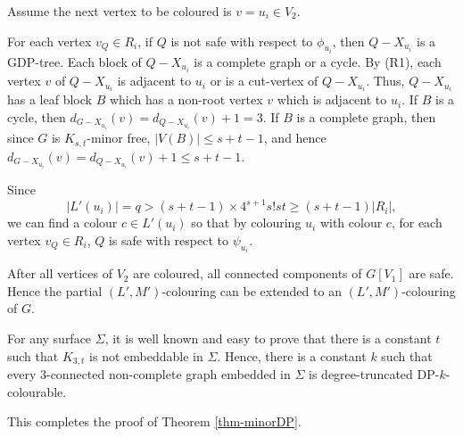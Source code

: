 \documentclass[11pt,a4paper]{article}
\theoremstyle{definition}
\begin{document}
Assume the next vertex to be coloured is $v=u_i \in V_2$. 

For each vertex $v_Q \in R_i$, if $Q$ is not safe with respect to $\phi_{u_i}$, then $Q-X_{u_i}$ is a GDP-tree. 
 Each block of $Q-X_{u_i}$ is a complete graph or a cycle. By (R1),  each vertex $v$ of $Q-X_{u_i}$ is adjacent to $u_i$ or is a cut-vertex of $Q-X_{u_i}$. Thus, $Q-X_{u_i}$ has a leaf block $B$ which has a non-root vertex $v$ which is adjacent to $u_i$. 
  If $B$ is a cycle, then $d_{G-X_{u_i}}(v) = d_{Q-X_{u_i}}(v)+1 = 3$. If $B$ is a complete graph, then 
  since $G$ is $K_{s,t}$-minor free, $|V(B)| \le s+t-1$, and hence  $d_{G-X_{u_i}}(v) = d_{Q-X_{u_i}}(v)+1 \le s+t-1$. 

  Since $$|L'(u_i)|=q>(s+t-1)\times 4^{s+1}s!st\ge (s+t-1)|R_i|,$$
  we can find a colour   $c \in L'(u_i)$
  so that by colouring $u_i$ with colour $c$, for each vertex $v_Q \in R_i$, $Q$ is safe with respect to $\psi_{u_i}$.
 
After all vertices of $V_2$ are coloured, all connected components of $G[V_1]$ are safe. Hence the partial $(L',M')$-colouring can be extended to an $(L',M')$-colouring of $G$. 
 
  

  For any surface $\Sigma$, it is well known and easy to prove that there is a constant $t$ such that $K_{3,t}$ is not embeddable in $\Sigma$. Hence, there is a constant $k$ such that every 3-connected non-complete graph embedded in $\Sigma$ is degree-truncated DP-$k$-colourable.
   
 
This completes the proof of Theorem \ref{thm-minorDP}.
\end{document}
